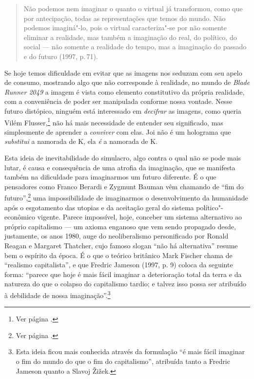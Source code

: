 \begin{quote}
Não podemos nem imaginar o quanto o virtual já transformou, como que por
antecipação, todas as representações que temos do mundo. Não podemos
imaginá"-lo, pois o virtual caracteriza"-se por não somente eliminar a
realidade, mas também a imaginação do real, do político, do social ---
não somente a realidade do tempo, mas a imaginação do passado e do
futuro (1997, p.\,71).
\end{quote}

Se hoje temos dificuldade em evitar que as imagens nos seduzam com seu
apelo de consumo, mostrando algo que não corresponde à realidade, no
mundo de \emph{Blade Runner 2049} a imagem é vista como elemento
constitutivo da própria realidade, com a conveniência de poder ser
manipulada conforme nossa vontade. Nesse futuro distópico, ninguém está
interessado em \emph{decifrar} as imagens, como queria Vilém
Flusser,\footnote{Ver página \pageref{decifradas}.} não há mais necessidade de entender seu
significado, mas simplesmente de aprender a \emph{conviver} com elas.
Joi não é um holograma que \emph{substitui} a namorada de K, ela
\emph{é} a namorada de K.

Esta ideia de inevitabilidade do simulacro, algo contra o qual não se
pode mais lutar, é causa e consequência de uma atrofia da imaginação,
que se manifesta também na dificuldade para imaginarmos um futuro
diferente. É o que pensadores como Franco Berardi e Zygmunt Bauman vêm
chamando de ``fim do futuro'',\footnote{Ver página \pageref{fim}.} uma impossibilidade
de imaginarmos o desenvolvimento da humanidade após o esgotamento das
utopias e da aceitação geral do sistema político"-econômico vigente.
Parece impossível, hoje, conceber um sistema alternativo ao próprio
capitalismo --- um axioma enganoso que vem sendo propagado desde,
justamente, os anos 1980, auge do neoliberalismo personificado por
Ronald Reagan e Margaret Thatcher, cujo famoso slogan ``não há
alternativa'' resume bem o espírito da época. É o que o teórico
britânico Mark Fischer chama de ``realismo capitalista'', e que Fredric \label{realismo}
Jameson (1997, p. 9) coloca da seguinte forma: ``parece que hoje é mais
fácil imaginar a deterioração total da terra e da natureza do que o
colapso do capitalismo tardio; e talvez isso possa ser atribuído à
debilidade de nossa imaginação''.\footnote{Esta ideia ficou mais
  conhecida através da formulação ``é mais fácil imaginar o fim do mundo
  do que o fim do capitalismo'', atribuída tanto a Fredric Jameson quanto
  a Slavoj Žižek.}

